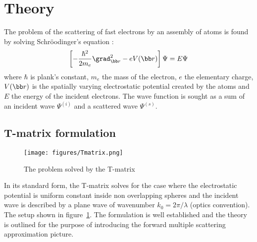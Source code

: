 \section{Theory}

The problem of the scattering of fast electrons by an assembly of atoms is
found by solving Schr{\"o}odinger's equation :
%
\begin{equation}\label{eq:schro}
  \left[-\frac{\hbar^2}{2m_e}\grad_{\bb r}^2 - eV(\bb r) \right] \Psi = E\Psi
\end{equation}
%
where $\hbar$ is plank's constant, $m_e$ the mass of the electron,
$e$ the elementary charge, $V(\bb r)$ is the spatially varying electrostatic
potential created by the atoms and $E$ the energy of the incident electrons.
The wave function is sought as a sum of an incident wave $\Psi^{(i)}$
and a scattered wave $\Psi^{(s)}$.

\subsection{T-matrix formulation}

\begin{figure}[h!]
  \centering
  \texttt{[image: figures/Tmatrix.png]}
\caption{The problem solved by the T-matrix}\label{fig:Tmatrix}
\end{figure}

In its standard form, the T-matrix solves for the case where the electrostatic
potential is uniform constant inside non overlapping spheres and the
incident wave is described by a plane wave of wavenumber $k_0=2\pi/\lambda$
(optics convention).
The setup shown in figure~\ref{fig:Tmatrix}.
The formulation is well established and the theory is outlined for the purpose
of introducing the forward multiple scattering approximation picture.

